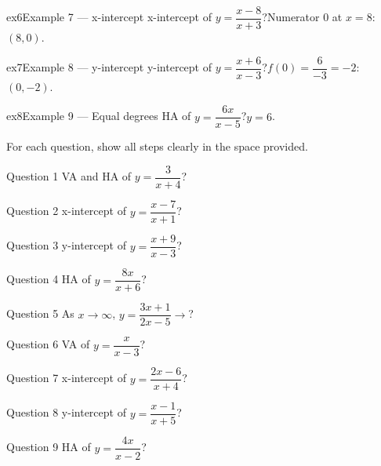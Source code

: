 \documentclass[11pt]{article}
\begin{document}
\begin{example}{ex6}{Example 7 --- x-intercept}
x-intercept of $y=\dfrac{x-8}{x+3}$?\soln Numerator $0$ at $x=8$: $(8,0)$.
\end{example}

\begin{example}{ex7}{Example 8 --- y-intercept}
y-intercept of $y=\dfrac{x+6}{x-3}$?\soln $f(0)=\dfrac{6}{-3}=-2$: $(0,-2)$.
\end{example}

\begin{example}{ex8}{Example 9 --- Equal degrees}
HA of $y=\dfrac{6x}{x-5}$?\soln $y=6$.
\end{example}

\clearpage
{}
For each question, show all steps clearly in the space provided.

\begin{qbox}{Question 1}
VA and HA of $y=\dfrac{3}{x+4}$?\workspace{2.4cm}
\end{qbox}

\begin{qbox}{Question 2}
x-intercept of $y=\dfrac{x-7}{x+1}$?\workspace{2.4cm}
\end{qbox}

\begin{qbox}{Question 3}
y-intercept of $y=\dfrac{x+9}{x-3}$?\workspace{2.4cm}
\end{qbox}

\begin{qbox}{Question 4}
HA of $y=\dfrac{8x}{x+6}$?\workspace{2.4cm}
\end{qbox}

\begin{qbox}{Question 5}
As $x\to\infty$, $y=\dfrac{3x+1}{2x-5}\to$?\workspace{2.4cm}
\end{qbox}

\begin{qbox}{Question 6}
VA of $y=\dfrac{x}{x-3}$?\workspace{2.4cm}
\end{qbox}

\begin{qbox}{Question 7}
x-intercept of $y=\dfrac{2x-6}{x+4}$?\workspace{2.4cm}
\end{qbox}

\begin{qbox}{Question 8}
y-intercept of $y=\dfrac{x-1}{x+5}$?\workspace{2.4cm}
\end{qbox}

\begin{qbox}{Question 9}
HA of $y=\dfrac{4x}{x-2}$?\workspace{2.4cm}
\end{qbox}
\end{document}
